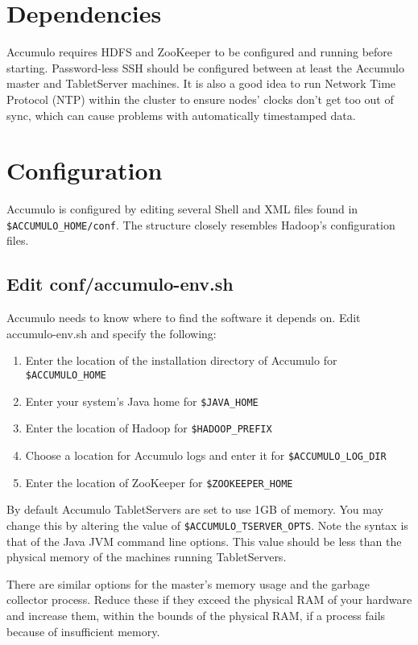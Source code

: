 \section{Dependencies}
Accumulo requires HDFS and ZooKeeper to be configured and running
before starting. Password-less SSH should be configured between at least the
Accumulo master and TabletServer machines. It is also a good idea to run Network
Time Protocol (NTP) within the cluster to ensure nodes' clocks don't get too out of
sync, which can cause problems with automatically timestamped data. 

\section{Configuration}

Accumulo is configured by editing several Shell and XML files found in
\texttt{\$ACCUMULO\_HOME/conf}. The structure closely resembles Hadoop's configuration
files.

\subsection{Edit conf/accumulo-env.sh}

Accumulo needs to know where to find the software it depends on. Edit accumulo-env.sh 
and specify the following:

\begin{enumerate}
\item{Enter the location of the installation directory of Accumulo for \texttt{\$ACCUMULO\_HOME}}
\item{Enter your system's Java home for \texttt{\$JAVA\_HOME}}
\item{Enter the location of Hadoop for \texttt{\$HADOOP\_PREFIX}}
\item{Choose a location for Accumulo logs and enter it for \texttt{\$ACCUMULO\_LOG\_DIR}}
\item{Enter the location of ZooKeeper for \texttt{\$ZOOKEEPER\_HOME}}
\end{enumerate}

By default Accumulo TabletServers are set to use 1GB of memory. You may change
this by altering the value of \texttt{\$ACCUMULO\_TSERVER\_OPTS}. Note the syntax is that of
the Java JVM command line options. This value should be less than the physical
memory of the machines running TabletServers.

There are similar options for the master's memory usage and the garbage collector
process. Reduce these if they exceed the physical RAM of your hardware and
increase them, within the bounds of the physical RAM, if a process fails because of
insufficient memory.

